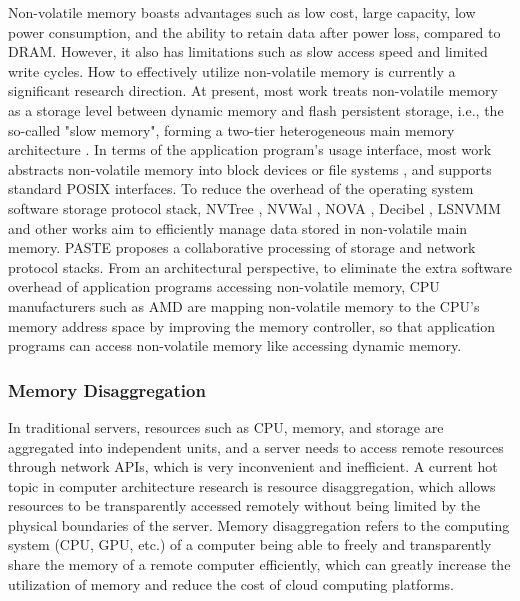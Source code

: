 Non-volatile memory boasts advantages such as low cost, large capacity, low power consumption, and the ability to retain data after power loss, compared to DRAM. However, it also has limitations such as slow access speed and limited write cycles. How to effectively utilize non-volatile memory is currently a significant research direction. At present, most work treats non-volatile memory as a storage level between dynamic memory and flash persistent storage, i.e., the so-called "slow memory", forming a two-tier heterogeneous main memory architecture \cite{dulloor2016data,agarwal2017thermostat}. In terms of the application program's usage interface, most work abstracts non-volatile memory into block devices \cite{bailey2011operating,huang2014nvram,kim2016nvwal,mogul2009operating,nanavati2017decibel,hu2017log} or file systems \cite{condit2009better,yang2015nv,xu2016nova}, and supports standard POSIX interfaces. To reduce the overhead of the operating system software storage protocol stack, NVTree \cite{yang2015nv}, NVWal \cite{kim2016nvwal}, NOVA \cite{xu2016nova}, Decibel \cite{nanavati2017decibel}, LSNVMM \cite{hu2017log} and other works aim to efficiently manage data stored in non-volatile main memory. PASTE \cite{honda2018paste} proposes a collaborative processing of storage and network protocol stacks. From an architectural perspective, to eliminate the extra software overhead of application programs accessing non-volatile memory, CPU manufacturers such as AMD are mapping non-volatile memory to the CPU's memory address space by improving the memory controller, so that application programs can access non-volatile memory like accessing dynamic memory.

\subsubsection{Memory Disaggregation}

In traditional servers, resources such as CPU, memory, and storage are aggregated into independent units, and a server needs to access remote resources through network APIs, which is very inconvenient and inefficient. A current hot topic in computer architecture research is resource disaggregation, which allows resources to be transparently accessed remotely without being limited by the physical boundaries of the server. Memory disaggregation \cite{lim2009disaggregated,han2013network} refers to the computing system (CPU, GPU, etc.) of a computer being able to freely and transparently share the memory of a remote computer efficiently, which can greatly increase the utilization of memory and reduce the cost of cloud computing platforms.

